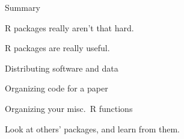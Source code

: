 \documentclass[12pt,t]{beamer}
\begin{document}
\begin{frame}{Summary}

\bbi
\item R packages really aren't that hard.
\item R packages are really useful.
  \bi
  \item Distributing software and data
  \item Organizing code for a paper
  \item Organizing your misc.\ R functions
  \ei
\item Look at others' packages, and learn from them.
\ei


\end{frame}
\end{document}
